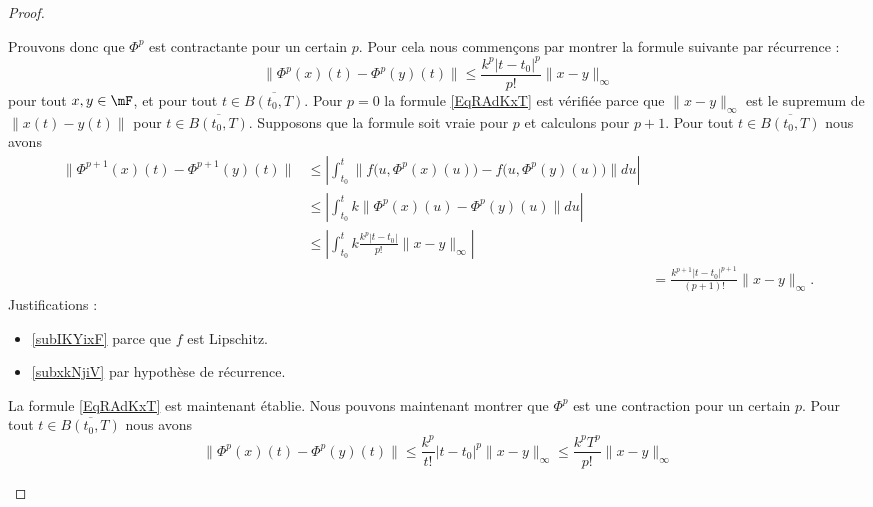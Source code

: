 \begin{proof}
\begin{subproof}
		Prouvons donc que \( \Phi^p\) est contractante pour un certain \( p\). Pour cela nous commençons par montrer la formule suivante par récurrence :
		\begin{equation}        \label{EqRAdKxT}
			\big\| \Phi^p(x)(t)-\Phi^p(y)(t) \big\|\leq \frac{ k^p| t-t_0 |^p }{ p! }\| x-y \|_{\infty}
		\end{equation}
		pour tout \( x,y\in\mF\), et pour tout \( t\in\overline{ B(t_0,T) }\). Pour \( p=0\) la formule \eqref{EqRAdKxT} est vérifiée parce que \( \| x-y \|_{\infty}\) est le supremum de \( \| x(t)-y(t) \|\) pour \( t\in\overline{ B(t_0,T) }\). Supposons que la formule soit vraie pour \( p\) et calculons pour \( p+1\). Pour tout \( t\in\overline{ B(t_0,T) }\) nous avons
		\begin{subequations}
			\begin{align}
				\big\| \Phi^{p+1}(x)(t)-\Phi^{p+1}(y)(t) \big\| & \leq \left| \int_{t_0}^t\big\| f\big( u,\Phi^p(x)(u) \big)-f\big( u,\Phi^p(y)(u) \big) \big\|du \right|                                                                  \\
				                                                & \leq \left| \int_{t_0}^tk\| \Phi^p(x)(u)-\Phi^p(y)(u) \|du \right|                  \label{subIKYixF}                                                                    \\
				                                                & \leq \left| \int_{t_0}^tk\frac{ k^p| t-t_0 | }{ p! }\| x-y \|_{\infty} \right|                          & \label{subxkNjiV}                                              \\
				                                                &                                                                                                         & = \frac{ k^{p+1}| t-t_0 |^{p+1} }{ (p+1)! }\| x-y \|_{\infty}.
			\end{align}
		\end{subequations}
		Justifications :
		\begin{itemize}
			\item \eqref{subIKYixF} parce que \( f\) est Lipschitz.
			\item \eqref{subxkNjiV} par hypothèse de récurrence.
		\end{itemize}
		La formule \eqref{EqRAdKxT} est maintenant établie. Nous pouvons maintenant montrer que \( \Phi^p\) est une contraction pour un certain \( p\). Pour tout \( t\in \overline{ B(t_0,T) }\) nous avons
		\begin{equation}
			\| \Phi^p(x)(t)-\Phi^p(y)(t) \|\leq \frac{ k^p }{ t! }| t-t_0 |^p\| x-y \|_{\infty}     \leq \frac{ k^pT^p }{ p! }\| x-y \|_{\infty}

\end{equation}
\end{subproof}
\end{proof}
